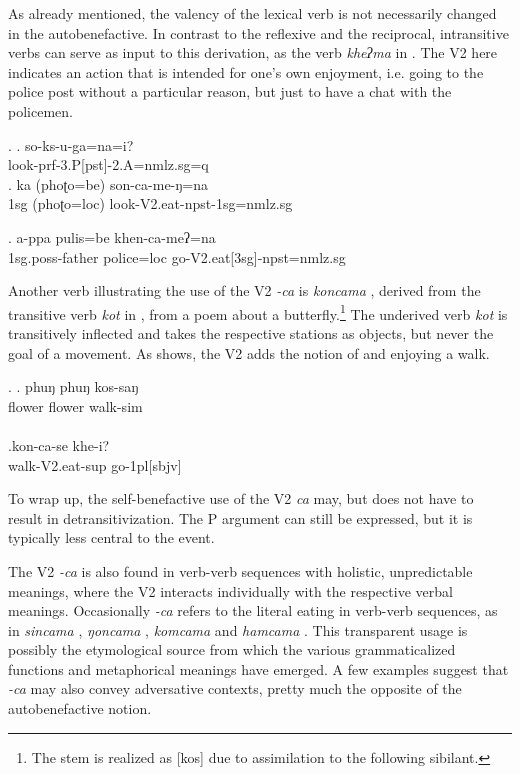 As already mentioned, the valency of the lexical verb is not necessarily changed in the autobenefactive. In contrast to the reflexive and the reciprocal,  intransitive verbs can serve as input to this derivation, as the verb \emph{kheʔma}  in \NNext. The V2 here indicates an action that is intended for one's own enjoyment, i.e. going to the police post without a particular reason, but just to have a chat with the policemen.

\ex. \ag.  so-ks-u-ga=na=i?\\
look{\sc -prf-3.P[pst]-2.A=nmlz.sg=q} \\
	\bg. ka (phoʈo=be) son-ca-me-ŋ=na\\
	{\sc 1sg} (phoʈo{\sc =loc}) look{\sc -V2.eat-npst-1sg=nmlz.sg}	\\


\exg. a-ppa pulis=be khen-ca-meʔ=na\\
	{\sc 1sg.poss}-father police{\sc =loc} go{\sc -V2.eat[3sg]-npst=nmlz.sg}	\\


Another verb illustrating the use of the V2 \emph{-ca} is \emph{koncama} , derived from the transitive verb \emph{kot}  in \Next[a], from a poem about a butterfly.\footnote{The stem is realized as [kos] due to assimilation to the following sibilant.}  The underived verb \emph{kot} is transitively inflected and takes the respective stations as objects, but never the goal of a movement. As  \Next[b] shows, the V2 adds the notion of  and enjoying a walk.

	\ex. \ag. phuŋ  phuŋ  kos-saŋ\\
	flower flower walk{\sc -sim} \\
	  \\
\bg.kon-ca-se khe-i?\\
	walk-{\sc V2.eat-sup} go-{\sc 1pl[sbjv]}\\


To wrap up, the self-benefactive use of the V2 \emph{ca} may, but does not have to result in detransitivization. The P argument can still be expressed, but it is typically less central to the event. 

The V2 \emph{-ca} is also found in verb-verb sequences with holistic, unpredictable meanings, where the V2 interacts individually with the respective verbal meanings. Occasionally \emph{-ca} refers to the literal eating in verb-verb sequences, as in \emph{sincama} , \emph{ŋoncama} , \emph{komcama}  and \emph{hamcama} . This transparent usage is possibly the etymological source from which the various grammaticalized functions and metaphorical meanings have  emerged. A few  examples suggest that \emph{-ca} may also convey adversative contexts, pretty much the opposite of the autobenefactive notion. 

